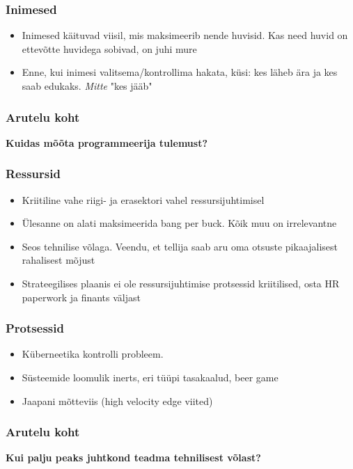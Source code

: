 \begin{frame}[fragile]
  \frametitle{Inimesed}
	\begin{itemize}
		\item Inimesed käituvad viisil, mis maksimeerib nende huvisid. Kas need huvid on ettevõtte huvidega sobivad, on juhi mure
		\item Enne, kui inimesi valitsema/kontrollima hakata, küsi: kes läheb ära ja kes saab edukaks. \emph{Mitte} "kes jääb" 
	\end{itemize}
\end{frame}


\begin{frame}[fragile]
  \frametitle{Arutelu koht}
		\begin{center}
			\textbf{Kuidas mõõta programmeerija tulemust?}
		\end{center}
\end{frame}

\begin{frame}[fragile]
  \frametitle{Ressursid}
	\begin{itemize}
		\item Kriitiline vahe riigi- ja erasektori vahel ressursijuhtimisel
		\item Ülesanne on alati maksimeerida bang per buck. Kõik muu on irrelevantne
		\item Seos tehnilise võlaga. Veendu, et tellija saab aru oma otsuste pikaajalisest rahalisest mõjust
		\item Strateegilises plaanis ei ole ressursijuhtimise protsessid kriitilised, osta HR paperwork ja finants väljast
	\end{itemize}
\end{frame}

\begin{frame}[fragile]
  \frametitle{Protsessid}
	\begin{itemize}
		\item Küberneetika kontrolli probleem. 
		\item Süsteemide loomulik inerts, eri tüüpi tasakaalud, beer game
		\item Jaapani mõtteviis (high velocity edge viited)
	\end{itemize}
\end{frame}


\begin{frame}[fragile]
  \frametitle{Arutelu koht}
		\begin{center}
			\textbf{Kui palju peaks juhtkond teadma tehnilisest võlast?}
		\end{center}
\end{frame}

